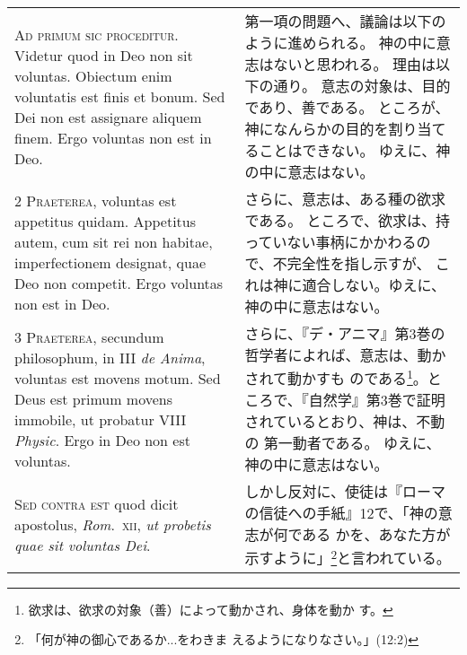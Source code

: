 \documentclass[10pt]{jsarticle} %
\begin{document}
\begin{longtable}{p{21em}p{21em}}



{\huge A}{\scshape d primum sic proceditur}. Videtur quod in
Deo non sit voluntas. Obiectum enim voluntatis est finis et bonum. Sed
Dei non est assignare aliquem finem. Ergo voluntas non est in Deo.

&

 第一項の問題へ、議論は以下のように進められる。
 神の中に意志はないと思われる。
 理由は以下の通り。
 意志の対象は、目的であり、善である。
 ところが、神になんらかの目的を割り当てることはできない。
 ゆえに、神の中に意志はない。
 
\\


{\scshape 2 Praeterea}, voluntas est appetitus
quidam. Appetitus autem, cum sit rei non habitae, imperfectionem
designat, quae Deo non competit. Ergo voluntas non est in Deo.

&

 さらに、意志は、ある種の欲求である。
 ところで、欲求は、持っていない事柄にかかわるので、不完全性を指し示すが、
 これは神に適合しない。ゆえに、神の中に意志はない。

\\


{\scshape 3 Praeterea}, secundum philosophum, in III {\itshape de
Anima}, voluntas est movens motum. Sed Deus est primum movens
immobile, ut probatur VIII {\itshape Physic}. Ergo in Deo non est voluntas.

&

 さらに、『デ・アニマ』第3巻の哲学者によれば、意志は、動かされて動かすも
 のである\footnote{欲求は、欲求の対象（善）によって動かされ、身体を動か
 す。}。ところで、『自然学』第3巻で証明されているとおり、神は、不動の
 第一動者である。
 ゆえに、神の中に意志はない。

\\


{\scshape  Sed contra est} quod dicit apostolus,
{\itshape Rom}.~{\scshape xii}, {\itshape ut probetis quae sit voluntas Dei}.

&

 しかし反対に、使徒は『ローマの信徒への手紙』12で、「神の意志が何である
 かを、あなた方が示すように」\footnote{「何が神の御心であるか...をわきま
 えるようになりなさい。」(12:2)}と言われている。
 
\\



\end{longtable}
\end{document}
